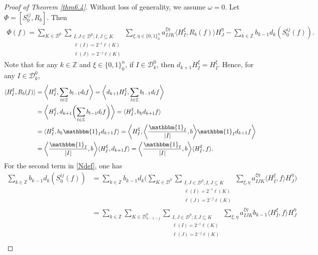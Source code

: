 \documentclass[oneside,english,a4wide]{amsart}
\numberwithin{equation}{section}
\numberwithin{figure}{section}
\theoremstyle{plain}
\theoremstyle{plain}
\theoremstyle{definition}
\theoremstyle{plain}
\theoremstyle{remark}
\theoremstyle{definition}
\theoremstyle{remark}
\theoremstyle{definition}
\newcommand{\8}{\infty}
\begin{document}
\begin{proof}[Proof of Theorem \ref{thm6.4}]
	Without loss of generality, we assume $\omega=0$.
	Let $\varPhi=[S^{ij}_0,R_b]$. Then
	\begin{equation}\label{Ndef}
		\begin{aligned}
			\varPhi(f)=\sum_{K\in\mathcal{D}^0}\sum_{\substack{I,J\in\mathcal{D}^0;I,J\subseteq K\\ \ell(I)=2^{-i}\ell(K)\\\ell(J)=2^{-j}\ell(K)}}\sum_{\xi,\eta\in\{0,1\}^n_0}a^{\xi\eta}_{IJK}\langle H^\xi_I,R_b(f)\rangle H^\eta_J-\sum_{k\in \mathbb{Z}}b_{k-1}d_k(S^{ij}_0(f)).
		\end{aligned}
	\end{equation}
	Note that for any $k\in\mathbb{Z}$ and $\xi\in\{0,1\}^n_0$, if $I\in\mathcal{D}^0_k$, then $d_{k+1}H^\xi_I=H^\xi_I$. Hence, for any $I\in \mathcal{ D}_k^0$,
	\begin{equation*}
		\begin{aligned}
			\langle H^\xi_I,R_b(f)\rangle{}&=\biggl\langle H^\xi_I,\sum_{l\in\mathbb{Z}}b_{l-1}d_lf\biggr\rangle
			=\biggl\langle d_{k+1}H^\xi_I,\sum_{l\in\mathbb{Z}}b_{l-1}d_lf\biggr\rangle\\
			&=\biggl\langle H^\xi_I,d_{k+1}\biggl(\sum_{l\in\mathbb{Z}}b_{l-1}d_lf\biggr)\biggr\rangle
			=\langle H^\xi_I,b_{k}d_{k+1}f\rangle\\
			&=\langle H^\xi_I,b_{k}\mathbbm{1}_Id_{k+1}f\rangle
			=\biggl\langle H^\xi_I,\biggl\langle \frac{\mathbbm{1}_I}{|I|},b\biggr\rangle\mathbbm{1}_Id_{k+1}f\biggr\rangle\\
			&=\biggl\langle \frac{\mathbbm{1}_I}{|I|},b\biggr\rangle\langle H^\xi_I,d_{k+1}f\rangle=\biggl\langle \frac{\mathbbm{1}_I}{|I|},b\biggr\rangle\langle H^\xi_I,f\rangle.
		\end{aligned}
	\end{equation*}
	For the second term in \eqref{Ndef}, one has
	\begin{equation*}
		\begin{aligned}
			\sum_{k\in \mathbb{Z}}b_{k-1}d_k(S^{ij}_0(f)){}&=\sum_{k\in \mathbb{Z}}b_{k-1}d_k\biggl(\sum_{K\in\mathcal{D}^0}\sum_{\substack{I,J\in\mathcal{D}^0;I,J\subseteq K\\ \ell(I)=2^{-i}\ell(K)\\\ell(J)=2^{-j}\ell(K)}}\sum_{\xi,\eta}a_{IJK}^{\xi\eta}\langle H^\xi_I,f\rangle H^\eta_J\biggr)\\&=\sum_{k\in \mathbb{Z}}\sum_{K\in\mathcal{D}^0_{k-1-j}}\sum_{\substack{I,J\in\mathcal{D}^0;I,J\subseteq K\\ \ell(I)=2^{-i}\ell(K)\\\ell(J)=2^{-j}\ell(K)}}\sum_{\xi,\eta}a_{IJK}^{\xi\eta}b_{k-1}\langle H^\xi_I,f\rangle H^\eta_J\\

\end{aligned}
\end{equation*}
\end{proof}
\end{document}
